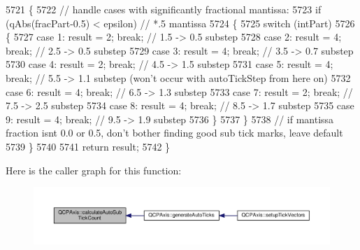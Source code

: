 \begin{DoxyCode}
5721   \{
5722     \textcolor{comment}{// handle cases with significantly fractional mantissa:}
5723     \textcolor{keywordflow}{if} (qAbs(fracPart-0.5) < epsilon) \textcolor{comment}{// *.5 mantissa}
5724     \{
5725       \textcolor{keywordflow}{switch} (intPart)
5726       \{
5727         \textcolor{keywordflow}{case} 1: result = 2; \textcolor{keywordflow}{break}; \textcolor{comment}{// 1.5 -> 0.5 substep}
5728         \textcolor{keywordflow}{case} 2: result = 4; \textcolor{keywordflow}{break}; \textcolor{comment}{// 2.5 -> 0.5 substep}
5729         \textcolor{keywordflow}{case} 3: result = 4; \textcolor{keywordflow}{break}; \textcolor{comment}{// 3.5 -> 0.7 substep}
5730         \textcolor{keywordflow}{case} 4: result = 2; \textcolor{keywordflow}{break}; \textcolor{comment}{// 4.5 -> 1.5 substep}
5731         \textcolor{keywordflow}{case} 5: result = 4; \textcolor{keywordflow}{break}; \textcolor{comment}{// 5.5 -> 1.1 substep (won't occur with autoTickStep from here on)}
5732         \textcolor{keywordflow}{case} 6: result = 4; \textcolor{keywordflow}{break}; \textcolor{comment}{// 6.5 -> 1.3 substep}
5733         \textcolor{keywordflow}{case} 7: result = 2; \textcolor{keywordflow}{break}; \textcolor{comment}{// 7.5 -> 2.5 substep}
5734         \textcolor{keywordflow}{case} 8: result = 4; \textcolor{keywordflow}{break}; \textcolor{comment}{// 8.5 -> 1.7 substep}
5735         \textcolor{keywordflow}{case} 9: result = 4; \textcolor{keywordflow}{break}; \textcolor{comment}{// 9.5 -> 1.9 substep}
5736       \}
5737     \}
5738     \textcolor{comment}{// if mantissa fraction isnt 0.0 or 0.5, don't bother finding good sub tick marks, leave default}
5739   \}
5740   
5741   \textcolor{keywordflow}{return} result;
5742 \}
\end{DoxyCode}


Here is the caller graph for this function\+:\nopagebreak
\begin{figure}[H]
\begin{center}
\leavevmode
\includegraphics[width=350pt]{class_q_c_p_axis_a3c5c045019fcdc0843a3e064eda7478a_icgraph}
\end{center}
\end{figure}


\hypertarget{class_q_c_p_axis_a47bdb0a55de6759489ee47665199aebb}{}
